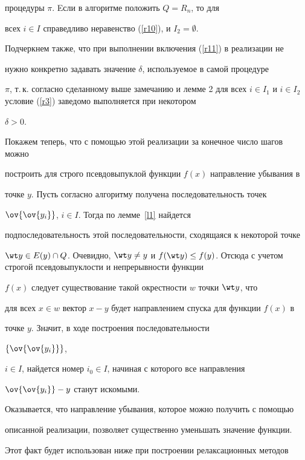 процедуры $\pi$. Eсли в алгоритме положить $Q=R_n$, то для


всех $i\in I$ справедливо неравенство (\ref{r10}), и $I_2=\emptyset$.


Подчеркнем также, что при выполнении включения (\ref{r11}) в реализации не


нужно конкретно задавать значение $\delta$, используемое в самой процедуре


$\pi$, т.\,к. согласно сделанному выше замечанию и лемме 2 для всех $i\in


I_1$ и $i\in I_2$ условие (\ref{r3}) заведомо выполняется при некотором


$\delta >0$.





Покажем теперь, что с помощью этой реализации за конечное число шагов можно


построить для строго псевдовыпуклой функции $f(x)$ направление убывания в


точке $y$. Пусть согласно алгоритму получена последовательность точек


$\ov{\ov{y_i}}$, $i\in I$. Тогда по лемме~\ref{l1} найдется


подпоследовательность этой последовательности, сходящаяся к некоторой точке


$\wt y \in E(y)\cap Q$. Очевидно, $\wt y \ne y$ и $f(\wt y)\le


f(y)$. Отсюда с учетом строгой псевдовыпуклости и непрерывности функции


$f(x)$ следует существование такой окрестности $w$ точки $\wt y$, что


для всех $x\in w$ вектор $x-y$ будет направлением спуска для функции $f(x)$ в


точке $y$. Значит, в ходе построения последовательности


$\{{\ov{\ov{y_i}}}\}$,


$i\in I$, найдется номер $i_0\in I$, начиная с которого все направления


$\ov{\ov{y_i}} -y$ станут искомыми.





Оказывается, что направление убывания, которое можно получить с помощью


описанной реализации, позволяет существенно уменьшать значение функции.


Этот факт будет использован ниже при построении релаксационных методов


